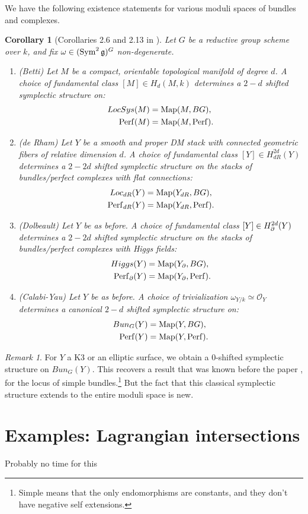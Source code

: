 \documentclass[10pt,a4paper,reqno,oneside]{book} %
\theoremstyle{plain}
\newtheorem{cor}[thm]{Corollary}
\theoremstyle{definition}
\theoremstyle{remark}
\newtheorem{rem}[thm]{Remark}
\numberwithin{equation}{section}
\begin{document}
We have the following existence statements for various moduli spaces of bundles and complexes.
\begin{cor}[Corollaries 2.6 and 2.13 in \cite{PTVV}]
\label{cor:symp_moduli}
Let $G$ be a reductive group scheme over $k$, and fix $\omega \in (\operatorname{Sym}^2 \mathfrak g) ^G$ non-degenerate.
\begin{enumerate}
\item (Betti) Let $M$ be a compact, orientable topological manifold of degree $d$. A choice of fundamental class $[M] \in H_d(M,k)$
determines a $2-d$ shifted symplectic structure on:
\begin{align*}
LocSys(M) &= \operatorname{Map}(M,BG), \\
\mathrm{Perf}(M) &= \operatorname{Map}(M, \mathrm{Perf}) .
\end{align*}

\item (de Rham) Let $Y$ be a smooth and proper DM stack with connected geometric fibers of relative dimension $d$. A choice of
fundamental class $[Y] \in H^{2d}_{dR}(Y)$ determines a $2-2d$ shifted symplectic structure on the stacks of bundles/perfect
complexes with flat connections:
\begin{align*}
Loc_{dR}(Y) &= \operatorname{Map}(Y_{dR},BG), \\
\mathrm{Perf}_{dR}(Y) &= \operatorname{Map}(Y_{dR}, \mathrm{Perf}) .
\end{align*}

\item (Dolbeault) Let $Y$ be as before. A choice of
fundamental class $[Y] \in H^{2d}_{\partial}(Y)$ determines a $2-2d$ shifted symplectic structure on the stacks of bundles/perfect
complexes with Higgs fields:
\begin{align*}
Higgs(Y) &= \operatorname{Map}(Y_{\partial},BG), \\
\mathrm{Perf}_{\partial}(Y) &= \operatorname{Map}(Y_{\partial}, \mathrm{Perf}) .
\end{align*}

\item (Calabi-Yau) Let $Y$ be as before. A choice of trivialization $\omega_{Y/k} \simeq \mathcal{O}_Y$ determines a canonical
$2-d$ shifted symplectic structure on:
\begin{align*}
Bun_G(Y) &= \operatorname{Map}(Y,BG), \\
\mathrm{Perf}(Y) &= \operatorname{Map}(Y, \mathrm{Perf}) .
\end{align*}
\end{enumerate}
\end{cor}

\begin{rem}
For $Y$ a K3 or an elliptic surface, we obtain a 0-shifted symplectic structure on $Bun_G(Y)$. This recovers
a result that was known before the paper \cite{PTVV}, for the locus of simple bundles.\footnote{Simple means that the
only endomorphisms are constants, and they don't have negative self extensions.} But the fact that this classical 
symplectic structure extends to the entire moduli space
is new.
\end{rem}



\section{Examples: Lagrangian intersections}
Probably no time for this





\end{document}
